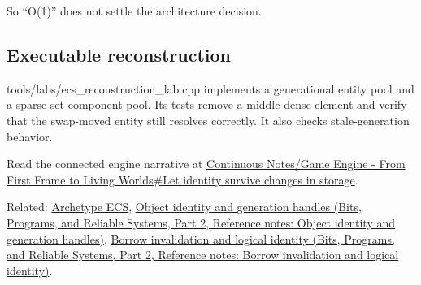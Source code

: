 So ``O(1)'' does not settle the architecture decision.

\subsection{Executable reconstruction}\label{appendix-8404d0b1a3e7-executable-reconstruction}

\hypertarget{appendix-8404d0b1a3e7-executable-reconstruction}{}

tools/labs/ecs\_reconstruction\_lab.cpp implements a generational entity pool and a sparse-set component pool. Its tests remove a middle dense element and verify that the swap-moved entity still resolves correctly. It also checks stale-generation behavior.

Read the connected engine narrative at \hyperref[05-engine-i-ch014-let-identity-survive-changes-in-storage]{Continuous Notes/Game Engine - From First Frame to Living Worlds\#Let identity survive changes in storage}.

Related: \hyperref[appendix-fbfeb0430008]{Archetype ECS}, \href{../01-Bits-Programs-and-Reliable-Systems-P02/main.pdf\#nameddest=appendix-f1581457d322}{Object identity and generation handles (Bits, Programs, and Reliable Systems, Part 2, Reference notes: Object identity and generation handles)}, \href{../01-Bits-Programs-and-Reliable-Systems-P02/main.pdf\#nameddest=appendix-f9b8b9188c7f}{Borrow invalidation and logical identity (Bits, Programs, and Reliable Systems, Part 2, Reference notes: Borrow invalidation and logical identity)}.
